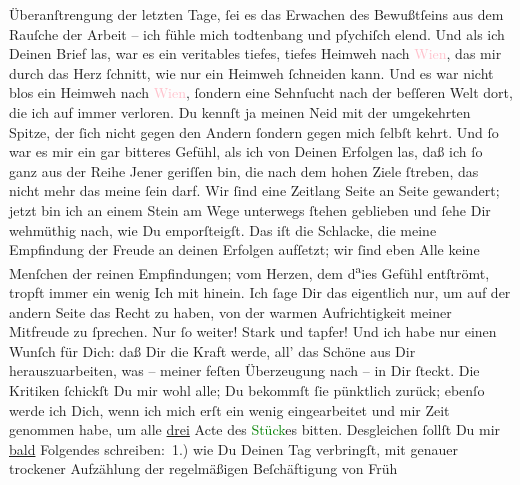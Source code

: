                Überanſtrengung der letzten Tage, ſei es das Erwachen des Bewußtſeins aus dem Rauſche
               der Arbeit – ich fühle mich todtenbang und pſychiſch elend. Und als ich Deinen Brief
               las, war es ein veritables tiefes, tiefes Heimweh nach \textcolor{pink}{Wien}{}\ledrightnote{\textcolor{pink}{Wien}}, das mir durch das Herz ſchnitt, {\pb}wie
               nur ein Heimweh ſchneiden kann. Und es war nicht blos ein Heimweh nach \textcolor{pink}{Wien}{}\ledrightnote{\textcolor{pink}{Wien}}, ſondern eine Sehnſucht nach der beſſeren Welt
               dort, die ich auf immer verloren. Du kennſt ja meinen Neid mit der umgekehrten
               Spitze, der ſich nicht gegen den Andern ſondern gegen mich ſelbſt kehrt. Und ſo war
               es mir ein gar bitteres Gefühl, als ich von Deinen Erfolgen las, daß ich ſo ganz aus
               der Reihe Jener geriſſen bin, die nach dem hohen Ziele ſtreben, das nicht mehr das
                   meine ſein darf. Wir ſind eine Zeitlang Seite an Seite gewandert; jetzt bin
               ich an einem Stein am Wege unterwegs ſtehen geblieben und ſehe Dir wehmüthig nach,
               wie Du emporſteigſt. Das iſt die Schlacke, die meine Empfindung der Freude an deinen
               Erfolgen aufſetzt; wir ſind eben Alle keine Menſchen der reinen Empfindungen; vom
               Herzen, dem d\substVorne{}\textsuperscript{a}\substDazwischen{}ie\substHinten{}s Gefühl entſtrömt, tropft immer ein wenig Ich mit hinein. Ich ſage Dir das
               eigentlich nur, um auf der andern Seite das Recht zu haben, von der warmen
               Aufrichtigkeit meiner Mitfreude zu ſprechen. Nur ſo weiter! Stark und tapfer! Und ich
               habe nur einen Wunſch für Dich: daß \strikeout{\textcolor{gray}{al}} Dir  die Kraft werde, all’ das Schöne
               aus Dir herauszuarbeiten, was – meiner feſten Überzeugung nach – in Dir ſteckt. Die
               Kritiken ſchickſt Du mir wohl alle; Du bekommſt ſie pünktlich zurück; ebenſo werde
               ich Dich, wenn ich mich erſt ein wenig eingearbeitet und mir Zeit genommen habe, um
               alle \uline{drei} Acte des \textcolor{green}{Stück}{}es{\pb}
               bitten. Desgleichen ſollſt Du mir \uline{bald}{ }Folgendes schreiben: 1.) wie Du Deinen Tag
               verbringſt, mit genauer trockener Aufzählung der regelmäßigen Beſchäftigung von Früh
